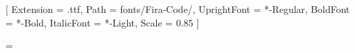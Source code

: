 %


\usepackage{amsmath}
\usepackage{amssymb}
\usepackage{amsthm}
\usepackage{thmtools}
\usepackage{mathtools}
\usepackage{thm-restate}
\usepackage{dsfont}        %
\usepackage{braceMnSymbol} %



\usepackage
[
    mono=false, %
]
{libertinus-otf} %

\usepackage{fontspec}  %
\setmonofont{FiraCode} %
[
	Extension = .ttf,
	Path = fonts/Fira-Code/,
	UprightFont = *-Regular,
	BoldFont = *-Bold,
	ItalicFont = *-Light,
	Scale = 0.85
]

\usepackage{url} %
\usepackage{bm}  %


\usepackage{graphicx} %
\usepackage
[
    subrefformat = simple, %
    labelformat = simple,  %
]
{subcaption}         %
\usepackage{wrapfig} %

\columnsep = \mymargininnersep
\renewcommand*{\thesubfigure}{~(\alph{subfigure})}

